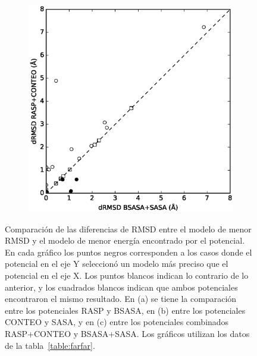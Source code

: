 \begin{figure}[hp]
  \begin{subfigure}{.55\linewidth}
    \includegraphics[width=\linewidth]{figures/resultados/rna/farfar/drmsd/BSASA+SASA_RASP+CONTEO_.eps}
    \caption{}
  \end{subfigure}

\caption[Comparación de las diferencias de RMSD entre el modelo de menor RMSD y el modelo de menor energía encontrado por el potencial.]{Comparación de las diferencias de RMSD entre el modelo de menor RMSD y el modelo de menor energía encontrado por el potencial. En cada gráfico los puntos negros corresponden a los casos donde el potencial en el eje Y seleccionó un modelo más preciso que el potencial en el eje X. Los puntos blancos indican lo contrario de lo anterior, y los cuadrados blancos indican que ambos potenciales encontraron el mismo resultado. En (a) se tiene la comparación entre los potenciales RASP y BSASA, en (b) entre los potenciales CONTEO y SASA, y en (c) entre los potenciales combinados RASP+CONTEO y BSASA+SASA.
Los gráficos utilizan los datos de la tabla~\ref{table:farfar}.}
\label{fig:farfar1}
\end{figure}


